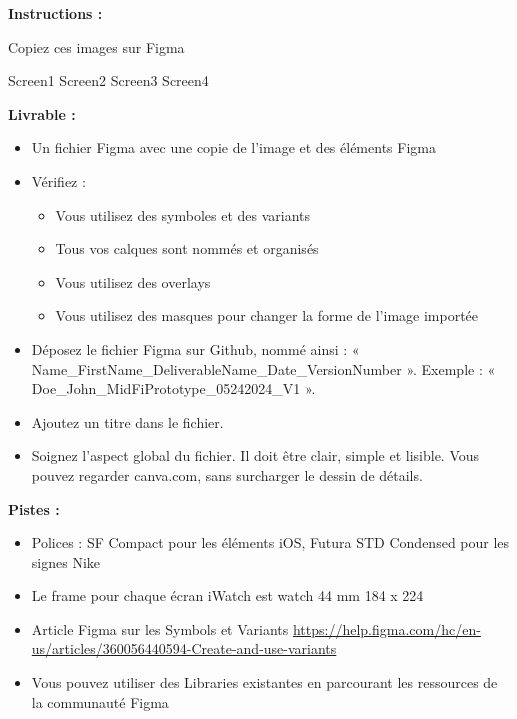 \makeheaderfiles

\textbf{Instructions :}

Copiez ces images sur Figma

Screen1
Screen2
Screen3
Screen4

\textbf{Livrable :}

\begin{itemize}
\item Un fichier Figma avec une copie de l'image et des éléments Figma
\item Vérifiez :
\begin{itemize}
\item Vous utilisez des symboles et des variants
\item Tous vos calques sont nommés et organisés
\item Vous utilisez des overlays
\item Vous utilisez des masques pour changer la forme de l'image importée
\end{itemize}
\item Déposez le fichier Figma sur Github, nommé ainsi : « Name\_FirstName\_DeliverableName\_Date\_VersionNumber ». Exemple : « Doe\_John\_MidFiPrototype\_05242024\_V1 ».
\item Ajoutez un titre dans le fichier.
\item Soignez l'aspect global du fichier. Il doit être clair, simple et lisible. Vous pouvez regarder canva.com, sans surcharger le dessin de détails.
\end{itemize}

\textbf{Pistes :}

\begin{itemize}
\item Polices : SF Compact pour les éléments iOS, Futura STD Condensed pour les signes Nike
\item Le frame pour chaque écran iWatch est watch 44 mm 184 x 224
\item Article Figma sur les Symbols et Variants \url{https://help.figma.com/hc/en-us/articles/360056440594-Create-and-use-variants}
\item Vous pouvez utiliser des Libraries existantes en parcourant les ressources de la communauté Figma
\end{itemize}


